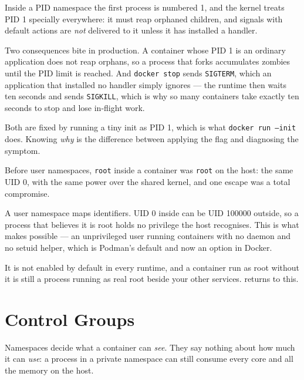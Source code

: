 \begin{conceptbox}
Inside a PID namespace the first process is numbered 1, and the kernel treats
PID 1 specially everywhere: it must reap orphaned children, and signals with
default actions are \emph{not} delivered to it unless it has installed a
handler.

\smallskip
Two consequences bite in production. A container whose PID 1 is an ordinary
application does not reap orphans, so a process that forks accumulates zombies
until the PID limit is reached. And \texttt{docker stop} sends
\texttt{SIGTERM}, which an application that installed no handler simply
ignores --- the runtime then waits ten seconds and sends \texttt{SIGKILL},
which is why so many containers take exactly ten seconds to stop and lose
in-flight work.

\smallskip
Both are fixed by running a tiny init as PID 1, which is what
\texttt{docker run --init} does. Knowing \emph{why} is the difference between
applying the flag and diagnosing the symptom.
\end{conceptbox}

\begin{alertbox}
Before user namespaces, \texttt{root} inside a container was \texttt{root} on
the host: the same UID 0, with the same power over the shared kernel, and one
escape was a total compromise.

\smallskip
A user namespace maps identifiers. UID 0 inside can be UID 100000 outside, so a
process that believes it is root holds no privilege the host recognises. This
is what makes  possible --- an unprivileged user
running containers with no daemon and no setuid helper, which is Podman's
default and now an option in Docker.

\smallskip
It is not enabled by default in every runtime, and a container run as root
without it is still a process running as real root beside your other services.
 returns to this.
\end{alertbox}

\section{Control Groups}

Namespaces decide what a container can \emph{see}. They say nothing about how
much it can \emph{use}: a process in a private namespace can still consume
every core and all the memory on the host.

